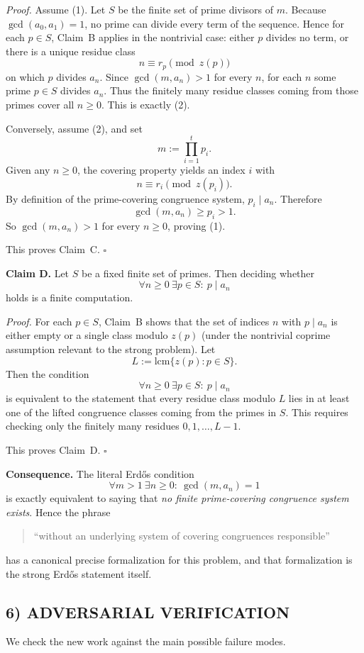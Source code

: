 \medskip
\noindent\emph{Proof.}
Assume (1). Let $S$ be the finite set of prime divisors of $m$. Because $\gcd(a_0,a_1)=1$, no prime can divide every term of the sequence. Hence for each $p\in S$, Claim~B applies in the nontrivial case: either $p$ divides no term, or there is a unique residue class
\[
n\equiv r_p\pmod{z(p)}
\]
on which $p$ divides $a_n$. Since $\gcd(m,a_n)>1$ for every $n$, for each $n$ some prime $p\in S$ divides $a_n$. Thus the finitely many residue classes coming from those primes cover all $n\ge 0$. This is exactly (2).

Conversely, assume (2), and set
\[
m:=\prod_{i=1}^t p_i.
\]
Given any $n\ge 0$, the covering property yields an index $i$ with
\[
n\equiv r_i\pmod{z(p_i)}.
\]
By definition of the prime-covering congruence system, $p_i\mid a_n$. Therefore
\[
\gcd(m,a_n)\ge p_i>1.
\]
So $\gcd(m,a_n)>1$ for every $n\ge 0$, proving (1).

This proves Claim~C.
\hfill$\square$

\medskip
\noindent\textbf{Claim D.} Let $S$ be a fixed finite set of primes. Then deciding whether
\[
\forall n\ge 0\ \exists p\in S:\ p\mid a_n
\]
holds is a finite computation.

\medskip
\noindent\emph{Proof.}
For each $p\in S$, Claim~B shows that the set of indices $n$ with $p\mid a_n$ is either empty or a single class modulo $z(p)$ (under the nontrivial coprime assumption relevant to the strong problem). Let
\[
L:=\mathrm{lcm}\{z(p): p\in S\}.
\]
Then the condition
\[
\forall n\ge 0\ \exists p\in S:\ p\mid a_n
\]
is equivalent to the statement that every residue class modulo $L$ lies in at least one of the lifted congruence classes coming from the primes in $S$. This requires checking only the finitely many residues $0,1,\dots,L-1$.

This proves Claim~D.
\hfill$\square$

\medskip
\noindent\textbf{Consequence.} The literal Erd\H{o}s condition
\[
\forall m>1\ \exists n\ge 0:\ \gcd(m,a_n)=1
\]
is exactly equivalent to saying that \emph{no finite prime-covering congruence system exists}. Hence the phrase
\begin{quote}
``without an underlying system of covering congruences responsible''
\end{quote}
has a canonical precise formalization for this problem, and that formalization is the strong Erd\H{o}s statement itself.

\subsection*{6) ADVERSARIAL VERIFICATION}
We check the new work against the main possible failure modes.

